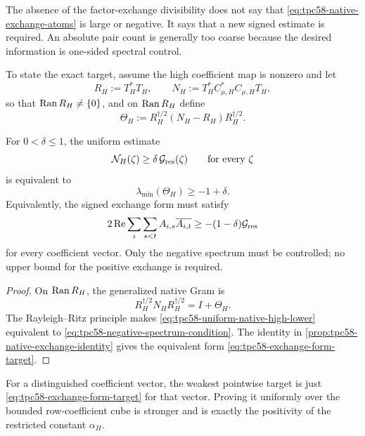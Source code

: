 The absence of the factor-exchange divisibility does not say that
\eqref{eq:tpc58-native-exchange-atoms} is large or negative.  It says that a
new signed estimate is required.  An absolute pair count is generally too
coarse because the desired information is one-sided spectral control.

To state the exact target, assume the high coefficient map is nonzero and let
\begin{equation}
 R_H:=T_H^*T_H,
 \qquad
 N_H:=T_H^*C_{\mu,H}^*C_{\mu,H}T_H,
 \label{eq:tpc58-high-Gram-pair}
\end{equation}
so that \(\operatorname{Ran} R_H\ne\{0\}\), and on \(\operatorname{Ran} R_H\) define
\begin{equation}
 \Theta_H
 :=R_H^{\dagger/2}(N_H-R_H)R_H^{\dagger/2}.
 \label{eq:tpc58-high-relative-defect}
\end{equation}

\begin{corollary}
\label{cor:tpc58-negative-spectrum-gate}
For \(0<\delta\le1\), the uniform estimate
\begin{equation}
 \mathcal N_H(\zeta)\ge\delta\,\mathcal G_{\rm res}(\zeta)
 \qquad\text{for every }\zeta
 \label{eq:tpc58-uniform-native-high-lower}
\end{equation}
is equivalent to
\begin{equation}
 \lambda_{\min}(\Theta_H)\ge-1+\delta.
 \label{eq:tpc58-negative-spectrum-condition}
\end{equation}
Equivalently, the signed exchange form must satisfy
\begin{equation}
 2\operatorname{Re}
 \sum_i\sum_{s<t}A_{i,s}\overline{A_{i,t}}
 \ge-(1-\delta)\mathcal G_{\rm res}
 \label{eq:tpc58-exchange-form-target}
\end{equation}
for every coefficient vector.  Only the negative spectrum must be
controlled; no upper bound for the positive exchange is required.
\end{corollary}

\begin{proof}
On \(\operatorname{Ran} R_H\), the generalized native Gram is
\[
 R_H^{\dagger/2}N_HR_H^{\dagger/2}=I+\Theta_H.
\]
The Rayleigh--Ritz principle makes
\eqref{eq:tpc58-uniform-native-high-lower} equivalent to
\eqref{eq:tpc58-negative-spectrum-condition}.  The identity in
\cref{prop:tpc58-native-exchange-identity} gives the equivalent form
\eqref{eq:tpc58-exchange-form-target}.
\end{proof}

For a distinguished coefficient vector, the weakest pointwise target is
just \eqref{eq:tpc58-exchange-form-target} for that vector.  Proving it
uniformly over the bounded row-coefficient cube is stronger and is exactly
the positivity of the restricted constant \(\alpha_H\).

